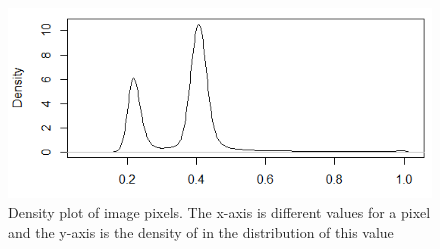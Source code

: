 \begin{figure}
\centering
\includegraphics[width=\linewidth]{Images/Distribution}
\caption{Density plot of image pixels. The x-axis is different values for a pixel and the y-axis is the density of in the distribution of this value}
\label{fig:pixeldistribution}
\end{figure}











